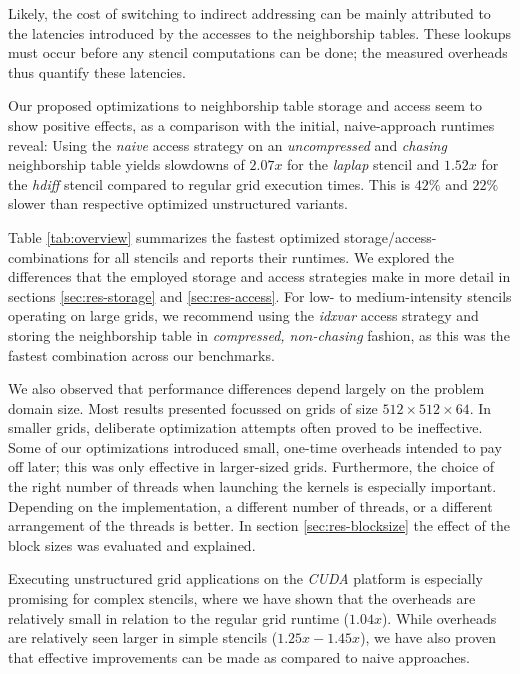 Likely, the cost of switching to indirect addressing can be mainly attributed to the latencies introduced by the accesses to the neighborship tables. These lookups must occur before any stencil computations can be done; the measured overheads thus quantify these latencies.

Our proposed optimizations to neighborship table storage and access seem to show positive effects, as a comparison with the initial, naive-approach runtimes reveal: Using the \emph{naive} access strategy on an \emph{uncompressed} and \emph{chasing} neighborship table yields slowdowns of $2.07x$ for the \emph{laplap} stencil and $1.52x$ for the \emph{hdiff} stencil compared to regular grid execution times. This is $42\%$ and $22\%$ slower than respective optimized unstructured variants.

Table \ref{tab:overview} summarizes the fastest optimized storage/access-combinations for all stencils and reports their runtimes. We explored the differences that the employed storage and access strategies make in more detail in sections \ref{sec:res-storage} and \ref{sec:res-access}. For low- to medium-intensity stencils operating on large grids, we recommend using the \emph{idxvar} access strategy and storing the neighborship table in \emph{compressed, non-chasing} fashion, as this was the fastest combination across our benchmarks. 

We also observed that performance differences depend largely on the problem domain size. Most results presented focussed on grids of size $512\times 512\times 64$. In smaller grids, deliberate optimization attempts often proved to be ineffective. Some of our optimizations introduced small, one-time overheads intended to pay off later; this was only effective in larger-sized grids. Furthermore, the choice of the right number of threads when launching the kernels is especially important. Depending on the implementation, a different number of threads, or a different arrangement of the threads is better. In section \ref{sec:res-blocksize} the effect of the block sizes was evaluated and explained.

Executing unstructured grid applications on the \emph{CUDA} platform is especially promising for complex stencils, where we have shown that the overheads are relatively small in relation to the regular grid runtime ($1.04x$). While overheads are relatively seen larger in simple stencils ($1.25x - 1.45x$), we have also proven that effective improvements can be made as compared to naive approaches.